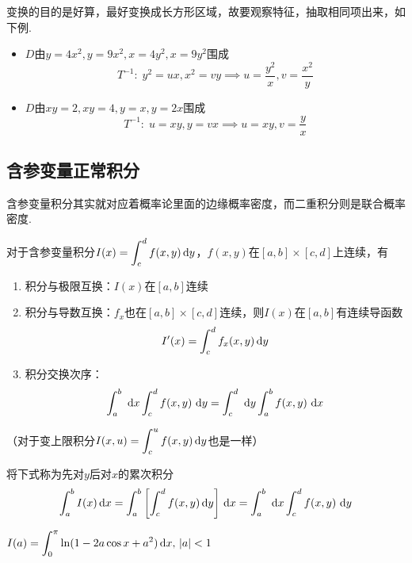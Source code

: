 \par 变换的目的是好算，最好变换成长方形区域，故要观察特征，抽取相同项出来，如下例.
\begin{example}
\begin{itemize}
	\item $D$由$y=4x^2,y=9x^2,x=4y^2,x=9y^2$围成
	\[T^{-1}:\;y^2=ux,x^2=vy\implies u=\frac{y^2}{x},v=\frac{x^2}{y}\]
	\item $D$由$xy=2,xy=4,y=x,y=2x$围成
	\[T^{-1}:\;u=xy,y=vx\implies u=xy,v=\frac{y}{x}\]
\end{itemize}
\end{example}

\subsection{含参变量正常积分}
含参变量积分其实就对应着概率论里面的边缘概率密度，而二重积分则是联合概率密度.
\begin{theorem}
对于含参变量积分$I(x)=\displaystyle\int_c^df(x,y)\,\mathrm{d} y$，$f(x,y)$在$[a,b]\times [c,d]$上连续，有
\begin{enumerate}
	\item 积分与极限互换：$I(x)$在$[a,b]$连续
	\item 积分与导数互换：$f_x$也在$[a,b]\times [c,d]$连续，则$I(x)$在$[a,b]$有连续导函数
	\[I'(x)=\int_c^df_x(x,y)\,\mathrm{d} y\]
	\item 积分交换次序：
	\[\displaystyle\int_{a}^{b}{}\,\,\mathrm{d} x\displaystyle\int_{c}^{d}{f(x,y)}\,\,\mathrm{d} y=\displaystyle\int_{c}^{d}{}\,\,\mathrm{d} y\displaystyle\int_{a}^{b}{f(x,y)}\,\,\mathrm{d} x\]
\end{enumerate}
（对于变上限积分$I(x,u)=\displaystyle\int_c^uf(x,y)\,\mathrm{d} y$也是一样）
\end{theorem}
\par 将下式称为先对$y$后对$x$的累次积分
\[\int_a^bI(x)\,\mathrm{d} x=\int_a^b\left[\int_c^df(x,y)\,\mathrm{d} y\right]\,\mathrm{d} x=\displaystyle\int_{a}^{b}{}\,\,\mathrm{d} x\displaystyle\int_{c}^{d}{f(x,y)}\,\,\mathrm{d} y\]
\begin{example}
$\displaystyle I(a)=\int_0^\pi\ln(1-2a\cos x+a^2)\,\mathrm{d} x,\,|a|<1$
\end{example}
